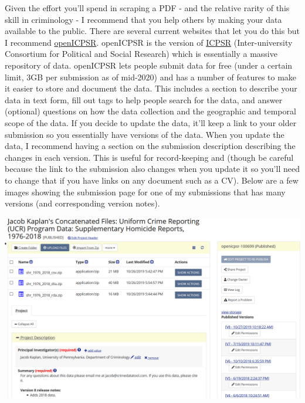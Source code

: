 \documentclass[
  12pt,
  openany]{book}
\begin{document}
Given the effort you'll spend in scraping a PDF - and the relative rarity of this skill in criminology - I recommend that you help others by making your data available to the public. There are several current websites that let you do this but I recommend \href{https://www.icpsr.umich.edu/web/pages/NACJD/index.html}{openICPSR}. openICPSR is the version of \href{https://www.icpsr.umich.edu/web/pages/}{ICPSR} (Inter-university Consortium for Political and Social Research) which is essentially a massive repository of data. openICPSR lets people submit data for free (under a certain limit, 3GB per submission as of mid-2020) and has a number of features to make it easier to store and document the data. This includes a section to describe your data in text form, fill out tags to help people search for the data, and answer (optional) questions on how the data collection and the geographic and temporal scope of the data. If you decide to update the data, it'll keep a link to your older submission so you essentially have versions of the data. When you update the data, I recommend having a section on the submission description describing the changes in each version. This is useful for record-keeping and (though be careful because the link to the submission also changes when you update it so you'll need to change that if you have links on any document such as a CV). Below are a few images showing the submission page for one of my submissions that has many versions (and corresponding version notes).

\includegraphics{images/openICPSR1.PNG}
\end{document}
